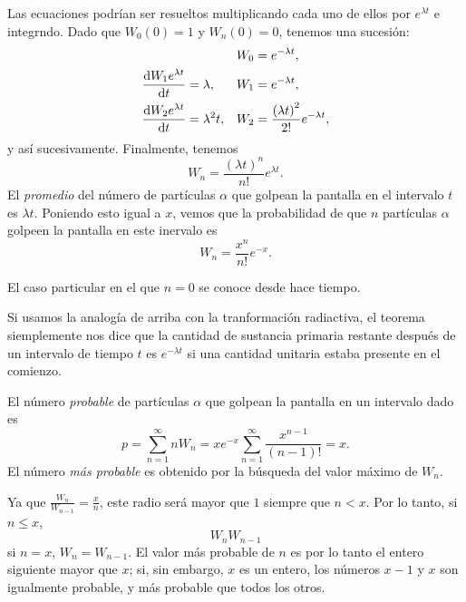 Las ecuaciones podrían ser resueltos multiplicando cada uno de ellos por $e^{\lambda t}$ e integrndo. Dado que $W_0(0)=1$ y $W_n(0)=0$, tenemos una sucesión:
\begin{align*}
  && W_0&= e^{-\lambda t},\\
  \diff{W_1e^{\lambda t}}{t}&=\lambda, & W_1&= e^{-\lambda t},\\
  \diff{W_2e^{\lambda t}}{t}&=\lambda^2t, & W_2&=\frac{{\left(\lambda t\right)}^2}{2!}e^{-\lambda t},\\
\end{align*}
y así sucesivamente. Finalmente, tenemos
\begin{equation*}
  W_n=\frac{{\left(\lambda t\right)}^n}{n!}e^{\lambda t}.
\end{equation*}
El \emph{promedio} del número de  partículas $\alpha$ que golpean la pantalla en el intervalo $t$ es $\lambda t$. Poniendo esto igual a $x$, vemos que la probabilidad de que $n$ partículas $\alpha$ golpeen la pantalla en este inervalo es
\begin{equation*}
  W_n=\frac{x^n}{n!}e^{-x}.
\end{equation*}

El caso particular en el que $n=0$ se conoce desde hace tiempo. %

Si usamos la analogía de arriba con la tranformación radiactiva, el teorema siemplemente nos dice que la cantidad de sustancia primaria restante después de un intervalo de tiempo $t$ es $e^{-\lambda t}$ si una cantidad unitaria estaba presente en el comienzo.

El número \emph{probable} de partículas $\alpha$ que golpean la pantalla en un intervalo dado es
\begin{equation*}
  p=\sum_{n=1}^{\infty}nW_n=xe^{-x}\sum_{n=1}^{\infty}\frac{x^{n-1}}{\left(n-1\right)!}=x.
\end{equation*}
El número \emph{más probable} es obtenido por la búsqueda del valor máximo de $W_n$.

Ya que $\frac{W_n}{W_{n-1}}=\frac{x}{n}$, este radio será mayor que $1$ siempre que $n<x$. Por lo tanto, si $n\le x$, %
\begin{equation*}
  W_n W_{n-1}%
\end{equation*}
si $n=x$, $W_n=W_{n-1}$. El valor más probable de $n$ es por lo tanto el entero siguiente mayor que $x$; si, sin embargo, $x$ es un entero, los números $x-1$ y $x$ son igualmente probable, y más probable que todos los otros.

